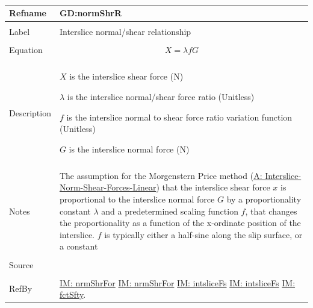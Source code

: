 \documentclass[12pt]{article}
\begin{document}
~\newline
 \noindent \begin{minipage}{\textwidth}
\begin{tabular}{p{} p{}}
\toprule \textbf{Refname} & \textbf{GD:normShrR}
\label{GD:normShrR}
\\ \midrule \\
Label & Interslice normal/shear relationship
        \\ \midrule \\
        Equation & \begin{displaymath}
                   X=λ f G
                   \end{displaymath}
                   \\ \midrule \\
                   Description & \begin{symbDescription}
                                 \item{$X$ is the interslice shear force (N)}
                                 \item{$λ$ is the interslice normal/shear force ratio (Unitless)}
                                 \item{$f$ is the interslice normal to shear force ratio variation function (Unitless)}
                                 \item{$G$ is the interslice normal force (N)}
                                 \end{symbDescription}
                                 \\ \midrule \\
                                 Notes & The assumption for the Morgenstern Price method (\hyperref[A:Interslice-Norm-Shear-Forces-Linear]{A: Interslice-Norm-Shear-Forces-Linear}) that the interslice shear force $x$ is proportional to the interslice normal force $G$ by a proportionality constant $λ$ and a predetermined scaling function $f$, that changes the proportionality as a function of the x-ordinate position of the interslice. $f$ is typically either a half-sine along the slip surface, or a constant
                                         \\ \midrule \\
                                         Source & \cite{chen2005}
                                                  \\ \midrule \\
                                                  RefBy & \hyperref[IM:nrmShrFor]{IM: nrmShrFor} \hyperref[IM:nrmShrFor]{IM: nrmShrFor} \hyperref[IM:intsliceFs]{IM: intsliceFs} \hyperref[IM:intsliceFs]{IM: intsliceFs} \hyperref[IM:fctSfty]{IM: fctSfty}.
\\ \bottomrule \end{tabular}
\end{minipage}\\
\end{document}
